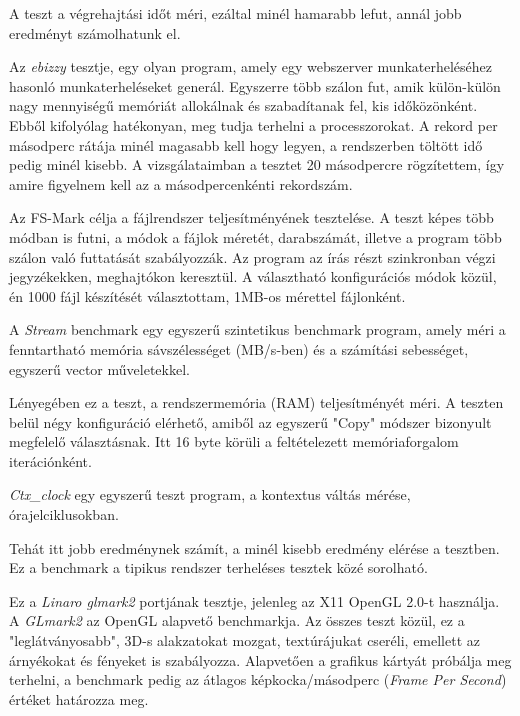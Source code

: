 A teszt a végrehajtási időt méri, ezáltal minél hamarabb lefut, annál jobb eredményt számolhatunk el.


Az \textit{ebizzy} tesztje, egy olyan program, amely egy webszerver munkaterheléséhez hasonló munkaterheléseket generál. Egyszerre több szálon fut, amik külön-külön nagy mennyiségű memóriát allokálnak és szabadítanak fel, kis időközönként. Ebből kifolyólag hatékonyan, meg tudja terhelni a processzorokat. A rekord per másodperc rátája minél magasabb kell hogy legyen, a rendszerben töltött idő pedig minél kisebb. A vizsgálataimban a tesztet 20 másodpercre rögzítettem, így amire figyelnem kell az a másodpercenkénti rekordszám.


Az FS-Mark célja a fájlrendszer teljesítményének tesztelése.
A teszt képes több módban is futni, a módok a fájlok méretét, darabszámát, illetve a program több szálon való futtatását szabályozzák. 
Az program az írás részt szinkronban végzi jegyzékekken, meghajtókon keresztül.
A választható konfigurációs módok közül, én 1000 fájl készítését választottam, 1MB-os mérettel fájlonként.


A \textit{Stream} benchmark egy egyszerű szintetikus benchmark program, amely méri a fenntartható memória sávszélességet (MB/s-ben) és a számítási sebességet, egyszerű vector műveletekkel.

Lényegében ez a teszt, a rendszermemória (RAM) teljesítményét méri.
A teszten belül négy konfiguráció elérhető, amiből az egyszerű "Copy" módszer bizonyult megfelelő választásnak.
Itt 16 byte körüli a feltételezett memóriaforgalom iterációnként.


\textit{Ctx\_clock} egy egyszerű teszt program, a kontextus váltás mérése, órajelciklusokban.

Tehát itt jobb eredménynek számít, a minél kisebb eredmény elérése a tesztben.
Ez a benchmark a tipikus rendszer terheléses tesztek közé sorolható.


Ez a \textit{Linaro glmark2} portjának tesztje, jelenleg az X11 OpenGL 2.0-t használja. A \textit{GLmark2} az OpenGL alapvető benchmarkja. Az összes teszt közül, ez a "leglátványosabb", 3D-s alakzatokat mozgat, textúrájukat cseréli, emellett az árnyékokat és fényeket is szabályozza.
Alapvetően a grafikus kártyát próbálja meg terhelni, a benchmark pedig az átlagos képkocka/másodperc (\textit{Frame Per Second}) értéket határozza meg.

